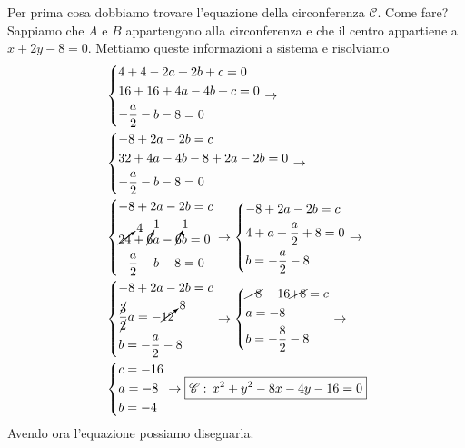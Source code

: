 Per prima cosa dobbiamo trovare l'equazione della circonferenza $\mathscr{C}$. Come fare? Sappiamo che
$A$ e $B$ appartengono alla circonferenza e che il centro appartiene a $x+2y-8=0$. Mettiamo queste
informazioni a sistema e risolviamo
\begin{align*}
  &\begin{dcases}
  4+4-2a+2b+c=0\\
  16+16+4a-4b+c=0\\
  -\frac{a}{2}-b-8=0
\end{dcases}\rightarrow\\
&\begin{dcases}
-8+2a-2b=c\\
32+4a-4b-8+2a-2b=0\\
-\frac{a}{2}-b-8=0
\end{dcases}\rightarrow\\
&\begin{dcases}
-8+2a-2b=c\\
\cancelto{4}{24}+\cancelto{1}{6}a-\cancelto{1}{6}b=0\\
-\frac{a}{2}-b-8=0
\end{dcases}\rightarrow
\begin{dcases}
  -8+2a-2b=c\\
  4+a+\frac{a}{2}+8=0\\
  b=-\frac{a}{2}-8
\end{dcases}\rightarrow\\
&\begin{dcases}
-8+2a-2b=c\\
\frac{\cancel{3}}{\cancel{2}}a = -\cancelto{8}{12}\\
b = -\frac{a}{2}-8
\end{dcases}\rightarrow
\begin{dcases}
  \cancel{-8}-16\cancel{+8}=c\\
  a = -8\\
  b = -\frac{8}{2}-8
\end{dcases}\rightarrow\\
&\begin{dcases}
c = -16\\
a = -8\\
b = -4
\end{dcases} \rightarrow \boxed{\mathscr{C}:\,x^2+y^2-8x-4y-16=0}
\end{align*}
Avendo ora l'equazione possiamo disegnarla.
